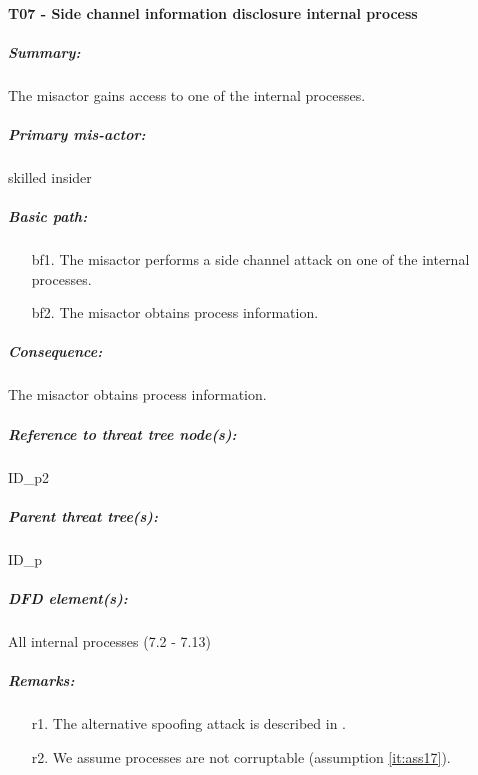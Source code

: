 

\paragraph{T07 - Side channel information disclosure internal process}
\label{par:t08}
    \subparagraph{Summary:} The misactor gains access to one of the internal processes.
    \subparagraph{Primary mis-actor:} skilled insider
    \subparagraph{Basic path:}
    \begin{enumerate}
        \item[bf1.] The misactor performs a side channel attack on one of the internal processes.
        \item[bf2.] The misactor obtains process information.
    \end{enumerate}
    \subparagraph{Consequence:} The misactor obtains process information.


    \subparagraph{Reference to threat tree node(s):} ID\_p2
    \subparagraph{Parent threat tree(s):} ID\_p
    \subparagraph{DFD element(s):} All internal processes (7.2 - 7.13)
    \subparagraph{Remarks:}
    \begin{enumerate}
        \item[r1.] The alternative spoofing attack is described in .
        \item[r2.] We assume processes are not corruptable (assumption \ref{it:ass17}).
    \end{enumerate}



